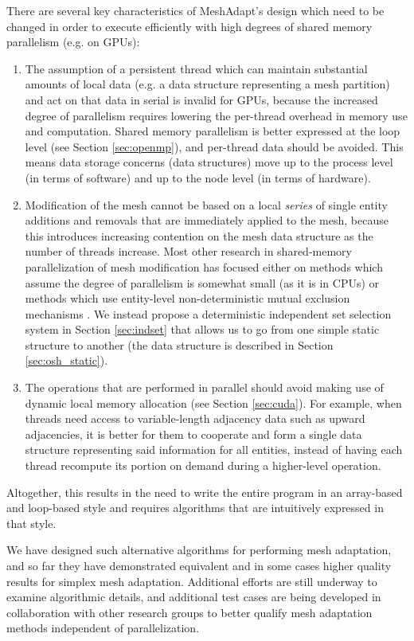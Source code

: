 There are several key characteristics of MeshAdapt's design
which need to be changed in order to execute efficiently with
high degrees of shared memory parallelism (e.g. on GPUs):
\begin{enumerate}
\item The assumption of a persistent thread which can maintain
substantial amounts of local data (e.g. a data structure
representing a mesh partition) and act on that data in serial
is invalid for GPUs, because the increased degree of parallelism
requires lowering the per-thread overhead in memory use and computation.
Shared memory parallelism is better expressed at the loop level
(see Section \ref{sec:openmp}), and per-thread data should be avoided.
This means data storage concerns (data structures) move up to
the process level (in terms of software) and up to the
node level (in terms of hardware).
\item Modification of the mesh cannot be based on a local \emph{series}
of single entity additions and removals that are immediately
applied to the mesh, because this
introduces increasing contention on the mesh data structure
as the number of threads increase.
Most other research in shared-memory parallelization of mesh modification
has focused either on methods which assume the degree of parallelism
is somewhat small \cite{remacle2015two} (as it is in CPUs) or
methods which use entity-level non-deterministic mutual exclusion
mechanisms \cite{navarro2011parallel}.
We instead propose a deterministic independent set selection system
in Section \ref{sec:indset} that allows us to go from one
simple static structure to another
(the data structure is described in Section \ref{sec:osh_static}).
\item The operations that are performed in parallel should
avoid making use of dynamic local memory allocation
(see Section \ref{sec:cuda}).
For example, when threads need access to variable-length adjacency
data such as upward adjacencies, it is better for them to
cooperate and form a single data structure representing said
information for all entities, instead of having each thread
recompute its portion on demand during a higher-level operation.
\end{enumerate}
Altogether, this results in the need to write the entire program
in an array-based and loop-based style and requires algorithms that
are intuitively expressed in that style.

We have designed such alternative algorithms for performing mesh
adaptation, and so far they have demonstrated
equivalent and in some cases higher quality results
for simplex mesh adaptation.
Additional efforts are still underway to examine algorithmic details,
and additional test cases are being developed in collaboration with
other research groups to better qualify mesh adaptation methods
independent of parallelization.

